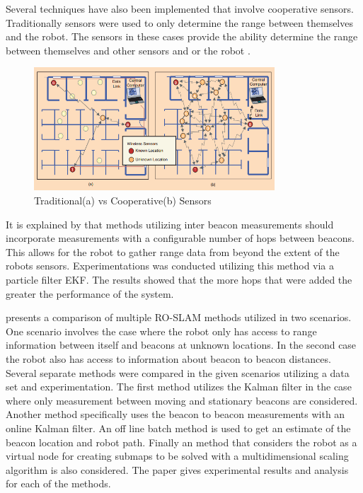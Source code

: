 \documentclass[conference]{IEEEtran}
\begin{document}
	
	
	Several techniques have also been implemented that involve cooperative sensors. Traditionally sensors were used to only determine the range between themselves and the robot. The sensors in these cases provide the ability determine the range between themselves and other sensors and or the robot \cite{Patwari2005}.
	
	\begin{figure}[h!]
		
		\centering
		
		\includegraphics[width=90mm]{coop_loc_comp_patwari.png}
		
		\caption{Traditional(a) vs Cooperative(b) Sensors \cite{Patwari2005}}
		
		\label{trad_vs_coop_sensors}
		
	\end{figure}
	
	\FloatBarrier
	
	
	
	It is explained by \cite{Torres-Gonzalez2015} that methods utilizing inter beacon measurements should incorporate measurements with a configurable number of hops between beacons. This allows for the robot to gather range data from beyond the extent of the robots sensors. Experimentations was conducted utilizing this method via a particle filter EKF. The results showed that the more hops that were added the greater the performance of the system. 
	
	
	
	\cite{Djugash2006} presents a comparison of multiple RO-SLAM methods utilized in two scenarios. One scenario involves the case where the robot only has access to range information between itself and beacons at unknown locations. In the second case the robot also has access to information about beacon to beacon distances. Several separate methods were compared in the given scenarios utilizing a data set and experimentation. The first method utilizes the Kalman filter in the case where only measurement between moving and stationary beacons are considered. Another method specifically uses the beacon to beacon measurements with an online Kalman filter. An off line batch method is used to get an estimate of the beacon location and robot path. Finally an method that considers the robot as a virtual node for creating submaps to be solved with a multidimensional scaling algorithm is also considered. The paper gives experimental results and analysis for each of the methods. 
	
\end{document}
